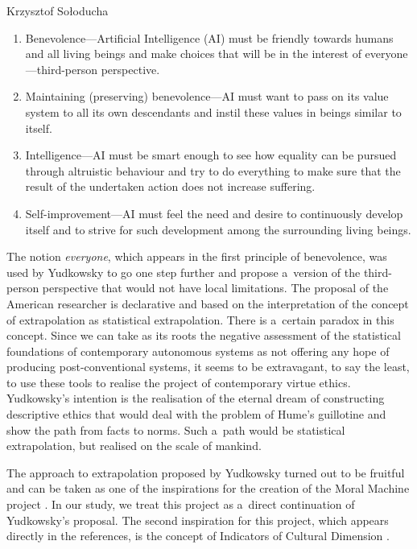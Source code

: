 \begin{artengenv}{Krzysztof Sołoducha}
\begin{enumerate}
\item Benevolence—Artificial Intelligence (AI) must be friendly towards humans and all living beings and make choices that will be in the interest of everyone—third-person perspective.
\item Maintaining (preserving) benevolence—AI must want to pass on its value system to all its own descendants and instil these values in beings similar to itself.
\item Intelligence—AI must be smart enough to see how equality can be pursued through altruistic behaviour and try to do everything to make sure that the result of the undertaken action does not increase suffering.
\item Self-improvement—AI must feel the need and desire to continuously develop itself and to strive for such development among the surrounding living beings.
\end{enumerate}
The notion \textit{everyone}, which appears in the first principle of benevolence, was used by Yudkowsky to go one step further and propose a~version of the third-person perspective that would not have local limitations. The proposal of the American researcher is declarative and based on the interpretation of the concept of extrapolation as statistical extrapolation. There is a~certain paradox in this concept. Since we can take as its roots the negative assessment of the statistical foundations of contemporary autonomous systems as not offering any hope of producing post-conventional systems, it seems to be extravagant, to say the least, to use these tools to realise the project of contemporary virtue ethics. Yudkowsky's intention is the realisation of the eternal dream of constructing descriptive ethics that would deal with the problem of Hume's guillotine and show the path from facts to norms. Such a~path would be statistical extrapolation, but realised on the scale of mankind.

The approach to extrapolation proposed by Yudkowsky turned out to be fruitful and can be taken as one of the inspirations for the creation of the Moral Machine project
\parencite[][]{awad_universals_2020}. %
 In our study, we treat this project as a~direct continuation of Yudkowsky's proposal. The second inspiration for this project, which appears directly in the references, is the concept of Indicators of Cultural Dimension 
\parencite[][]{hofstede_cultures_2010}.%



\end{artengenv}
